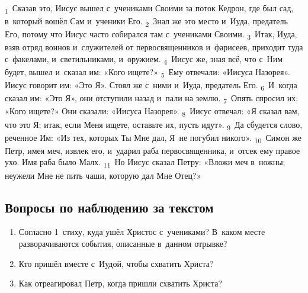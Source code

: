 \documentclass[a4paper,12pt]{article}
\begin{document}
\textsubscript{1}~Сказав это, Иисус вышел с~учениками Своими за поток Кедрон, где был сад, в~который вошёл Сам и~ученики Его. \textsubscript{2}~Знал же это место и~Иуда, предатель Его, потому что Иисус часто собирался там с~учениками Своими. \textsubscript{3}~Итак, Иуда, взяв отряд воинов и~служителей от первосвященников и~фарисеев, приходит туда с~факелами, и~светильниками, и~оружием. \textsubscript{4}~Иисус же, зная всё, что с~Ним будет, вышел и~сказал им: «Кого ищете?» \textsubscript{5}~Ему отвечали: «Иисуса Назорея». Иисус говорит им: «Это Я». Стоял же с~ними и~Иуда, предатель Его. \textsubscript{6}~И~когда сказал им: «Это Я», они отступили назад и~пали на землю. \textsubscript{7}~Опять спросил их: «Кого ищете?» Они сказали: «Иисуса Назорея». \textsubscript{8}~Иисус отвечал: «Я сказал вам, что это Я; итак, если Меня ищете, оставьте их, пусть идут». \textsubscript{9}~Да сбудется слово, реченное Им: «Из тех, которых Ты Мне дал, Я~не погубил никого». \textsubscript{10}~Симон же Петр, имея меч, извлек его, и~ударил раба первосвященника, и~отсек ему правое ухо. Имя раба было Малх. \textsubscript{11}~Но Иисус сказал Петру: «Вложи меч в~ножны; неужели Мне не пить чаши, которую дал Мне Отец?» 

\subsection*{Вопросы по наблюдению за текстом}
\begin{enumerate}
    \item Согласно 1~стиху, куда ушёл Христос с~учениками? В~каком месте разворачиваются события, описанные в~данном отрывке? 
    
    \myline
    
    \myline
    \item Кто пришёл вместе с~Иудой, чтобы схватить Христа? 
    
    \myline
    
    \myline
    \item Как отреагировал Петр, когда пришли схватить Христа? 
    
    \myline
    
    \myline
\end{enumerate}
\end{document}
